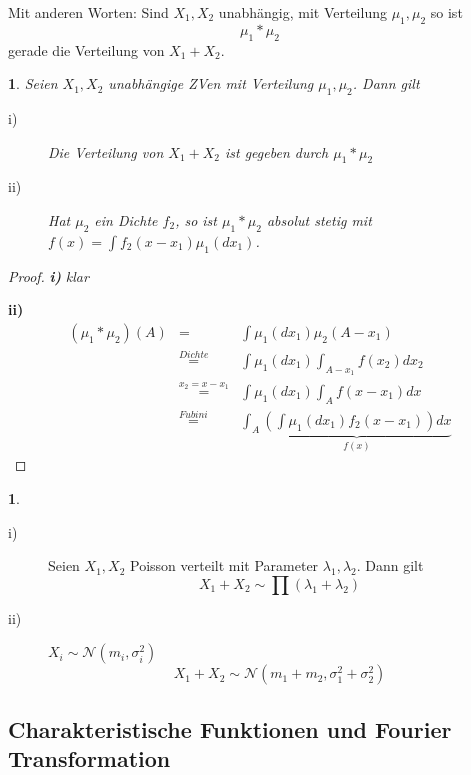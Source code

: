 \documentclass[10pt,a4paper]{report}
\numberwithin{equation}{section}
\numberwithin{figure}{section}
\theoremstyle{plain}
\theoremstyle{definition}
\theoremstyle{plain}
\newtheorem{prop}{\protect\propositionname}[section]
\theoremstyle{definition}
\newtheorem{example}{\protect\examplename}[section]
\theoremstyle{remark}
\theoremstyle{plain}
\theoremstyle{plain}
\theoremstyle{plain}
\theoremstyle{plain}
\theoremstyle{plain}
\providecommand{\examplename}{Beispiel}
\providecommand{\propositionname}{Satz}
\newcommand{\1}{ \mathbb{1} } %
\begin{document}
Mit anderen Worten: Sind $X_{1},X_{2}$ unabhängig, mit Verteilung
$\mu_{1},\mu_{2}$ so ist 
\[
\mu_{1}*\mu_{2}
\]
gerade die Verteilung von $X_{1}+X_{2}$\@.
\begin{prop}
Seien $X_{1},X_{2}$ unabhängige ZVen mit Verteilung $\mu_{1},\mu_{2}$.
Dann gilt
\begin{description}
\item [{i)}] Die Verteilung von $X_{1}+X_{2}$ ist gegeben durch $\mu_{1}*\mu_{2}$
\item [{ii)}] Hat $\mu_{2}$ ein Dichte $f_{2}$, so ist $\mu_{1}*\mu_{2}$
absolut stetig mit $f\left(x\right)=\int f_{2}\left(x-x_{1}\right)\mu_{1}\left(dx_{1}\right)$. 
\end{description}
\end{prop}
\begin{proof}
\textbf{\textit{i)}}\textit{ klar}

\textbf{ii)} 
\begin{eqnarray*}
\left(\mu_{1}*\mu_{2}\right)\left(A\right) & = & \int\mu_{1}\left(dx_{1}\right)\mu_{2}\left(A-x_{1}\right)\\
 & \overset{Dichte}{=} & \int\mu_{1}\left(dx_{1}\right)\int_{A-x_{1}}f\left(x_{2}\right)dx_{2}\\
 & \overset{x_{2}=x-x_{1}}{=} & \int\mu_{1}\left(dx_{1}\right)\int_{A}f\left(x-x_{1}\right)dx\\
 & \overset{Fubini}{=} & \int_{A}\underset{f\left(x\right)}{\underbrace{\left(\int\mu_{1}\left(dx_{1}\right)f_{2}\left(x-x_{1}\right)\right)dx}}
\end{eqnarray*}
\end{proof}
\begin{example}
 \ 
\begin{description}
\item [{i)}] Seien $X_{1},X_{2}$ Poisson verteilt mit Parameter $\lambda_{1},\lambda_{2}$.
Dann gilt
\[
X_{1}+X_{2}\sim\prod\left(\lambda_{1}+\lambda_{2}\right)
\]

\item [{ii)}] $X_{i}\sim\mathcal{N}\left(m_{i},\sigma_{i}^{2}\right)$
\[
X_{1}+X_{2}\sim\mathcal{N}\left(m_{1}+m_{2},\sigma_{1}^{2}+\sigma_{2}^{2}\right)
\]
 
\end{description}
\end{example}


\subsection*{Charakteristische Funktionen und Fourier Transformation}
\end{document}

